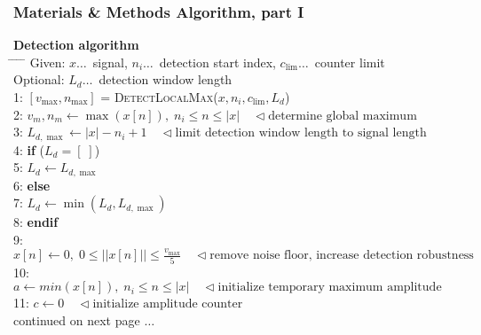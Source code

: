 \documentclass[11pt,aspectratio=169]{beamer}
\begin{document}
	\begin{frame}
		\frametitle{Materials \& Methods \textendash{} Algorithm, part I}\label{algo:detection}
		\small
		\begin{tabbing}
			\textbf{Detection algorithm} \\
			\hspace{0.4cm} \= \hspace{0.4cm} \= \hspace{0.4cm} \= \hspace{0.5cm} \= \kill
			 \> Given: $x \ldots$~signal, $n_i \ldots$~detection start index, $c_{\lim} \ldots$~counter limit \\
			 \> Optional: $L_d \ldots$~detection window length \\
			 1: \> $[v_{\max}, n_{\max}]$ = \textsc{DetectLocalMax}($x, n_i, c_{\lim}, L_d$) \\
			 2: \> \> $v_m, n_m \gets \max(x[n]), \; n_i \leq n \leq |x| \quad \triangleleft \text{determine global maximum}$ \\
			 3: \> \> $L_{d,\max} \gets |x| - n_i + 1 \quad \triangleleft \text{limit detection window length to signal length}$ \\
			 4: \> \> \textbf{if} ($L_d = [\;]$) \\
			 5: \> \> \> $L_d \gets L_{d,\max}$ \\
			 6: \> \> \textbf{else} \\
			 7: \> \> \> $L_d \gets \min(L_d, L_{d,\max})$ \\
			 8: \> \> \textbf{endif} \\
			 9: \> \> $x[n] \gets 0, \; 0 \leq ||x[n]|| \leq \frac{v_{\max}}{5} \quad \triangleleft \text{remove noise floor, increase detection robustness}$ \\
			 10: \> \> $a \gets min(x[n]), \; n_i \leq n \leq |x| \quad \triangleleft \text{initialize temporary maximum amplitude}$ \\
			 11: \> \> $c \gets 0 \quad \triangleleft \text{initialize amplitude counter}$ \\
			 continued on next page $\ldots$\\
		\end{tabbing}
	\end{frame}
\end{document}
